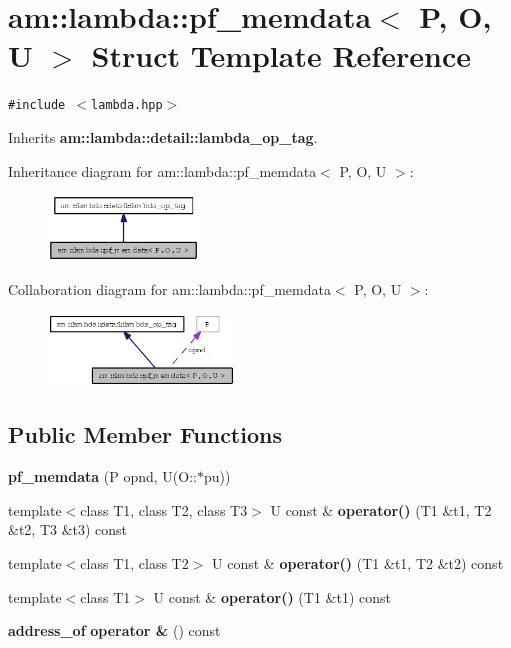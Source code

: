 \section{am::lambda::pf\_\-memdata$<$ P, O, U $>$ Struct Template Reference}
\label{structam_1_1lambda_1_1pf__memdata}
{\tt \#include $<$lambda.hpp$>$}

Inherits {\bf am::lambda::detail::lambda\_\-op\_\-tag}.

Inheritance diagram for am::lambda::pf\_\-memdata$<$ P, O, U $>$:\begin{figure}[H]
\begin{center}
\leavevmode
\includegraphics[width=113pt]{structam_1_1lambda_1_1pf__memdata__inherit__graph}
\end{center}
\end{figure}
Collaboration diagram for am::lambda::pf\_\-memdata$<$ P, O, U $>$:\begin{figure}[H]
\begin{center}
\leavevmode
\includegraphics[width=140pt]{structam_1_1lambda_1_1pf__memdata__coll__graph}
\end{center}
\end{figure}
\subsection*{Public Member Functions}
\begin{CompactItemize}
\item 
\textbf{pf\_\-memdata} (P opnd, U(O::$\ast$pu))\label{structam_1_1lambda_1_1pf__memdata_9fe96a12a227ed71cc1b0726116c8fb3}

\item 
template$<$class T1, class T2, class T3$>$ U const \& \textbf{operator()} (T1 \&t1, T2 \&t2, T3 \&t3) const \label{structam_1_1lambda_1_1pf__memdata_b40e1eefad6d26a955ffb4cc82434650}

\item 
template$<$class T1, class T2$>$ U const \& \textbf{operator()} (T1 \&t1, T2 \&t2) const \label{structam_1_1lambda_1_1pf__memdata_c6274e3380a83ffe6b2d96e1a36ddb68}

\item 
template$<$class T1$>$ U const \& \textbf{operator()} (T1 \&t1) const\label{structam_1_1lambda_1_1pf__memdata_60d1c08701f9c711ce5cbf8b505e5efe}

\item 
{\bf address\_\-of} \textbf{operator \&} () const\label{structam_1_1lambda_1_1pf__memdata_860bb00118c6f6147c231a62eaa50fcd}

\end{CompactItemize}
